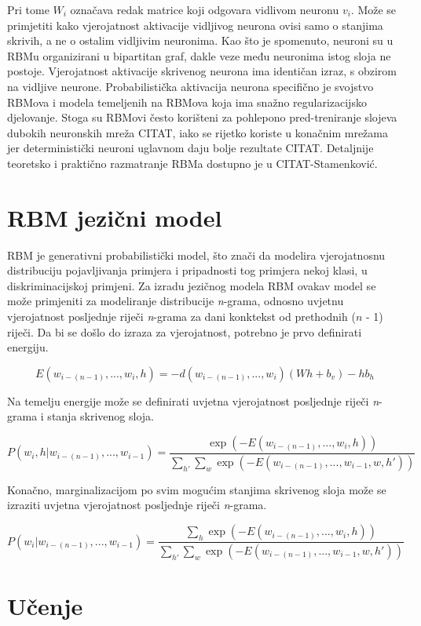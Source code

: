 \documentclass[times, utf8, diplomski, numeric]{fer}
\begin{document}
Pri tome $W_i$ označava redak matrice koji odgovara vidlivom neuronu $v_i$. Može se primjetiti kako vjerojatnost aktivacije vidljivog neurona ovisi samo o stanjima skrivih, a ne o ostalim vidljivim neuronima. Kao što je spomenuto, neuroni su u RBMu organizirani u bipartitan graf, dakle veze među neuronima istog sloja ne postoje. Vjerojatnost aktivacije skrivenog neurona ima identičan izraz, s obzirom na vidljive neurone. Probabilistička aktivacija neurona specifično je svojstvo RBMova i modela temeljenih na RBMova koja ima snažno regularizacijsko djelovanje. Stoga su RBMovi često korišteni za pohlepono pred-treniranje slojeva dubokih neuronskih mreža CITAT, iako se rijetko koriste u konačnim mrežama jer deterministički neuroni uglavnom daju bolje rezultate CITAT. Detaljnije teoretsko i praktično razmatranje RBMa dostupno je u CITAT-Stamenković.

\section{RBM jezični model}

RBM je generativni probabilistički model, što znači da modelira vjerojatnosnu distribuciju pojavljivanja primjera i pripadnosti tog primjera nekoj klasi, u diskriminacijskoj primjeni. Za izradu jezičnog modela RBM ovakav model se može primjeniti za modeliranje distribucije \textit{n}-grama, odnosno uvjetnu vjerojatnost posljednje riječi \textit{n}-grama za dani konktekst od prethodnih ($n$ - 1) riječi. Da bi se došlo do izraza za vjerojatnost, potrebno je prvo definirati energiju.

\[
E(w_{i - (n - 1)}, ... , w_i, h) =  - d(w_{i - (n - 1)}, ... , w_i) (W h + b_v) - h b_h
\]

Na temelju energije može se definirati uvjetna vjerojatnost posljednje riječi \textit{n}-grama i stanja skrivenog sloja.

\[
P(w_i, h | w_{i - (n - 1)}, ... , w_{i - 1})
 = \frac{\exp(-E(w_{i - (n - 1)}, ... , w_i, h))}
  {\sum_{h'} \sum_w \exp(-E(w_{i - (n - 1)}, ... , w_{i - 1}, w, h'))}
\]

Konačno, marginalizacijom po svim mogućim stanjima skrivenog sloja može se izraziti uvjetna vjerojatnost posljednje riječi \textit{n}-grama.

\[
P(w_i | w_{i - (n - 1)}, ... , w_{i - 1})
 = \frac{\sum_h \exp(-E(w_{i - (n - 1)}, ... , w_i, h))}
  {\sum_{h'} \sum_w \exp(-E(w_{i - (n - 1)}, ... , w_{i - 1}, w, h'))}
\]

\section{Učenje}
\end{document}
